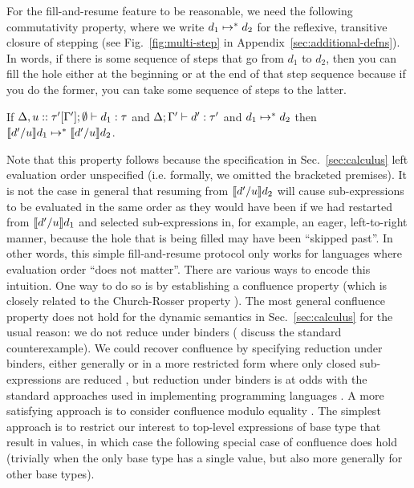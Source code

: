 For the fill-and-resume feature to be reasonable, we need the following commutativity property, where we write $d_1 \mapsto^* d_2$ for the reflexive, transitive closure of  stepping (see Fig.~\ref{fig:multi-step} in Appendix~\ref{sec:additional-defns}). In words, if there is some sequence of steps that go from $d_1$ to $d_2$, then you can fill the hole either at the beginning or at the end of that step sequence because if you do the former, you can take some sequence of steps to the latter. 
\begin{thm}[Commutativity]
  If $\Delta, u :: \tau'[\Gamma']; \emptyset \vdash d_1 : \tau$
  and $\Delta; \Gamma' \vdash d' : \tau'$ and $d_1 \mapsto^* d_2$
  then $\llbracket d' / u\rrbracket d_1 \mapsto^* \llbracket d' / u\rrbracket d_2$.
\end{thm}
Note that this property follows because the specification in Sec.~\ref{sec:calculus} left evaluation order unspecified (i.e. formally, we omitted the bracketed premises). It is not the case in general that resuming from $\llbracket d' / u\rrbracket d_2$ will cause sub-expressions to be evaluated in the same order as they would have been if we had restarted from $\llbracket d' / u\rrbracket d_1$ and selected sub-expressions in, for example, an eager, left-to-right manner, because the hole that is being filled may have been ``skipped past''. In other words, this simple fill-and-resume protocol only works for languages where evaluation order ``does not matter''. There are various ways to encode this intuition. One way to do so is by establishing a confluence property (which is closely related to the Church-Rosser property \cite{church1936some}). The most general confluence property does not hold for the dynamic semantics in Sec.~\ref{sec:calculus} for the usual reason: we do not reduce under binders (\citet{DBLP:conf/birthday/BlancLM05} discuss the standard counterexample). We could recover confluence by specifying reduction under binders, either generally or in a more restricted form where only closed sub-expressions are reduced \cite{DBLP:journals/tcs/CagmanH98,DBLP:conf/birthday/BlancLM05,levy1999explicit}, but reduction under binders is at odds with the standard approaches used in implementing programming languages \cite{DBLP:conf/birthday/BlancLM05}. A more satisfying approach is to consider confluence modulo equality \cite{Huet:1980ng}. The simplest approach is to restrict our interest to top-level expressions of base type that result in values, in which case the following special case of confluence does hold (trivially when the only base type has a single value, but also more generally for other base types).
